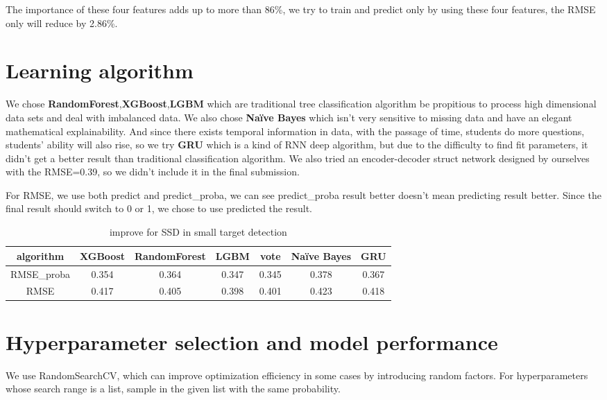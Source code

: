 \documentclass{article}
\begin{document}
	The importance of these four features adds up to more than 86\%, we try to train and predict only by using these four features, the RMSE only will reduce by 2.86\%.
	
	\section{Learning algorithm}
	We chose \textbf{RandomForest},\textbf{XGBoost},\textbf{LGBM} which are traditional tree classification algorithm be propitious to process high dimensional data sets and deal with imbalanced data.
	We also chose \textbf{Naïve Bayes} which isn't very sensitive to missing data and have an elegant mathematical explainability.
	And since there exists temporal information in data, with the passage of time, students do more questions, students' ability will also rise, so we try \textbf{GRU} which is a kind of RNN deep algorithm, but due to the difficulty to find fit parameters, it didn't get a better result than traditional classification algorithm. We also tried an encoder-decoder struct network designed by ourselves with the RMSE=0.39, so we didn't include it in the final submission.
	
	For RMSE, we use both predict and predict\_proba, we can see predict\_proba result better doesn't mean predicting result better. Since the final result should switch to 0 or 1, we chose to use predicted the result.
	
	\begin{table}[htb]
		\centering
		\caption{improve for SSD in small target detection}
		\label{table1}
		\begin{tabular}{|c|c|c|c|c|c|c|}
			\hline
			{algorithm} & {XGBoost} & {RandomForest} & {LGBM} & {vote} &{Naïve Bayes} &{GRU}\\
			\hline
			
			{RMSE\_proba} &{0.354}	&{0.364}	&{0.347}	&{0.345}	&{0.378} &{0.367}\\ 
			\hline
			{RMSE} &{0.417}	&{0.405}	&{0.398}	&{0.401}	&{0.423} &{0.418}\\ 
			\hline
		\end{tabular}
		\label{performance of each algorithm}
	\end{table}
	
	\section{Hyperparameter selection and model performance}
	We use RandomSearchCV, which can improve optimization efficiency in some cases by introducing random factors. For hyperparameters whose search range is a list, sample in the given list with the same probability.
	
\end{document}
